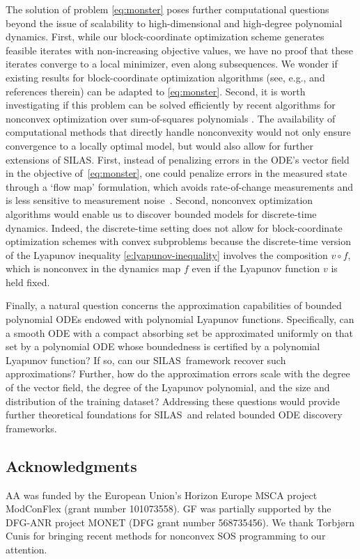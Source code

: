 \documentclass[11pt]{amsart}
\numberwithin{equation}{section}
\theoremstyle{plain}
\theoremstyle{definition}
\theoremstyle{remark}
\newcommand{\methodname}{{SILAS}}
\begin{document}
The solution of problem \cref{eq:monster} poses further computational questions beyond the issue of scalability to high-dimensional and high-degree polynomial dynamics. First, while our block-coordinate optimization scheme generates feasible iterates with non-increasing objective values, we have no proof that these iterates converge to a local minimizer, even along subsequences. We wonder if existing results for block-coordinate optimization algorithms (see, e.g., \cite{Bertsekas1999,Grippo1999,Beck2013} and references therein) can be adapted to \cref{eq:monster}. Second, it is worth investigating if this problem can be solved efficiently by recent algorithms for nonconvex optimization over sum-of-squares polynomials \cite{Cunis2025}.
The availability of computational methods that directly handle nonconvexity would not only ensure convergence to a locally optimal model, but would also allow for further extensions of \methodname. First, instead of penalizing errors in the ODE's vector field in the objective of~\cref{eq:monster}, one could penalize errors in the measured state through a `flow map' formulation, which avoids rate-of-change measurements and is less sensitive to measurement noise~\cite{GOYAL2025134893,Goyal2022}. Second, nonconvex optimization algorithms would enable us to discover bounded models for discrete-time dynamics. Indeed, the discrete-time setting does not allow for block-coordinate optimization schemes with convex subproblems because the discrete-time version of the Lyapunov inequality \cref{e:lyapunov-inequality} involves the composition $v \circ f$, which is nonconvex in the dynamics map $f$ even if the Lyapunov function $v$ is held fixed.

Finally, a natural question concerns the approximation capabilities of bounded polynomial ODEs endowed with polynomial Lyapunov functions. Specifically, can a smooth ODE with a compact absorbing set be approximated uniformly on that set by a polynomial ODE whose boundedness is certified by a polynomial Lyapunov function? If so, can our \methodname\ framework recover such approximations? Further, how do the approximation errors scale with the degree of the vector field, the degree of the Lyapunov polynomial, and the size and distribution of the training dataset? Addressing these questions would provide further theoretical foundations for \methodname\ and related bounded ODE discovery frameworks.

\subsection*{Acknowledgments}
AA was funded by the European Union's Horizon Europe MSCA project ModConFlex (grant number 101073558). GF was partially supported by the DFG-ANR project MONET (DFG grant number 568735456). We thank Torbjørn Cunis for bringing recent methods for nonconvex SOS programming to our attention.
\end{document}
